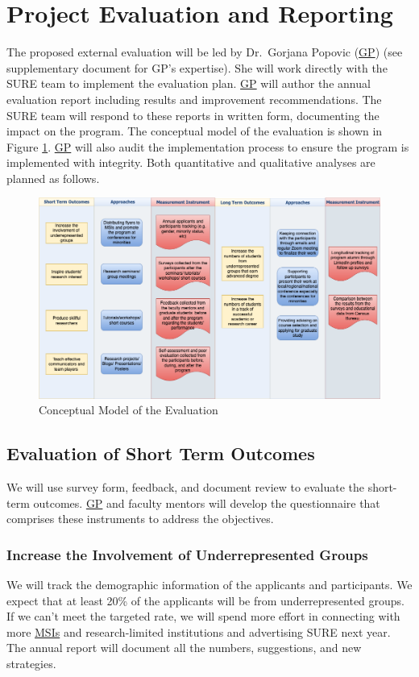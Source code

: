 \documentclass[11pt]{NSFamsart}
\newcommand{\GP}{\hyperlink{GPlink}{GP}\xspace}
\newcommand{\MSIs}{\hyperlink{MSIlink}{MSIs}\xspace}
\begin{document}
\section{Project Evaluation and Reporting}
The proposed external evaluation will be led by \hypertarget{GPlink}{Dr.~Gorjana Popovic} (\GP) (see supplementary document for GP’s expertise). She will work directly with the SURE team to implement the evaluation plan.  \GP will author the annual evaluation report including results and improvement recommendations. The SURE team will respond to these reports in written form, documenting
the impact on the program. The conceptual model of the evaluation is shown in Figure \ref{fig:my_label}. \GP will also audit the implementation process
to ensure the program is implemented with integrity. Both quantitative and qualitative analyses are planned as follows.

\begin{figure}[tbh]
    \centering
    \includegraphics[width = 16cm]{EvalModel.png}
    \caption{Conceptual Model of the Evaluation}
    \label{fig:my_label}
\end{figure}

\subsection{Evaluation of Short Term Outcomes}

We will use survey form, feedback, and document review to evaluate the short-term outcomes. 
\GP and faculty mentors will develop the questionnaire that comprises these instruments to address the objectives. 

\subsubsection{Increase the Involvement of Underrepresented Groups}
We will track the demographic information of the applicants and participants. We expect that at least 20\% of the applicants will be from underrepresented groups. If we can't meet the targeted rate, we will spend more effort in connecting with more \MSIs and research-limited institutions and advertising SURE next year.  The annual report will document all the numbers, suggestions, and new strategies. 
\end{document}
